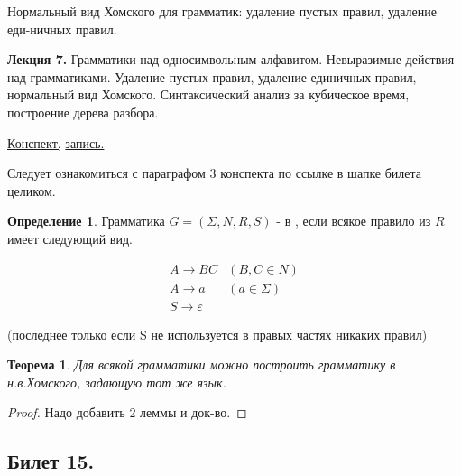\documentclass[a4paper]{article}
\newcommand{\mybox}{%
    \collectbox{%
        \setlength{\fboxsep}{1pt}%
        \fbox{\BOXCONTENT}%
    }%
}
\theoremstyle{indented}
\newtheorem{theorem}{Теорема}
\theoremstyle{definition}
\newtheorem{defn}{Определение}
\theoremstyle{remark}
\DeclareMathOperator{\ra}{\rightarrow}
\begin{document}
Нормальный вид Хомского для грамматик: удаление пустых правил, удаление еди-ничных правил.

\hrulefill

\textbf{Лекция 7.} Грамматики над односимвольным алфавитом. Невыразимые действия над грамматиками. Удаление пустых правил, удаление единичных правил, нормальный вид Хомского. Синтаксический анализ за кубическое время, построение дерева разбора.

\begin{flushright}
    \mybox{
        \href{https://users.math-cs.spbu.ru/~okhotin/teaching/tcs_fl_2021/okhotin_tcs_fl_2021_l7.pdf}{Конспект,}
        \href{https://disk.yandex.ru/d/knoQ44wLmGDwwQ/2021-2022%20учебный%20год%20(осенний%20семестр)/2%20курс/Теоретическая%20информатика/M2021-10-13_111709_1h40m_102.mp4}{запись.}
    }
\end{flushright}

Следует ознакомиться с параграфом 3 конспекта по ссылке в шапке билета целиком.

\begin{defn}
    Грамматика $G = (\Sigma, N, R, S)$ - в , если всякое правило из $R$ имеет следующий вид.

    \begin{equation*}
        \begin{matrix}
            A \ra BC & (B,C \in N) \\
            A \ra a & (a \in \Sigma) \\ 
            S \ra \varepsilon & 
        \end{matrix}
    \end{equation*}

(последнее только если S не используется в правых частях никаких правил)
\end{defn}

\begin{theorem}
    Для всякой грамматики можно построить грамматику в н.в.Хомского, задающую тот же язык.
\end{theorem}

\begin{proof}
    Надо добавить 2 леммы и док-во.
\end{proof}



\newpage 

\subsection{Билет 15.}
\end{document}
